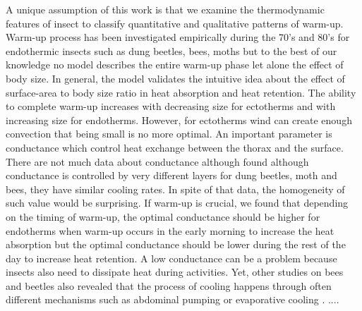 A unique assumption of this work is that we examine the thermodynamic features of insect to classify quantitative and qualitative patterns of warm-up.
Warm-up process has been investigated empirically during the 70's and 80's for endothermic insects  such as dung beetles, bees, moths \citep{Heinrich1975, Bartholomew1978, Bartholomew1981} but to the best of our knowledge no model describes the entire warm-up phase let alone the effect of body size.
In general, the model validates the intuitive idea about  the effect of surface-area to body size ratio in heat absorption and heat retention.
The ability to complete warm-up increases with decreasing size for ectotherms and with increasing size for endotherms.
However, for ectotherms wind can create enough convection that being small is no more optimal. %
An important parameter is conductance which control heat exchange between the thorax and the surface.
There are not much data about conductance although  \citet{Bartholomew1978} found although conductance is controlled by very different layers for dung beetles, moth and bees, they have similar cooling rates. %
In spite of that data, the homogeneity of such value would be surprising. %
If warm-up is crucial, we found that depending on the timing of warm-up, the optimal conductance should be higher for endotherms when warm-up occurs in the early morning  to increase the heat absorption but the optimal conductance should be lower during the rest of the day to increase heat retention.
A low conductance  can be a problem because insects also need to dissipate heat during activities.
Yet,  other studies on bees and beetles also revealed that the process of cooling happens through often different mechanisms such as abdominal pumping or evaporative cooling \citep{Heinrich1979, Verdu2012}.
....

